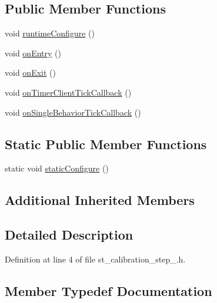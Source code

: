 \subsection*{Public Member Functions}
\begin{DoxyCompactItemize}
\item 
void \hyperlink{structsm__respira__1_1_1StCalibrationStep1_a041c623fb452bde3f3abd51eb5d9a7e6}{runtime\+Configure} ()
\item 
void \hyperlink{structsm__respira__1_1_1StCalibrationStep1_ab5935eecf1ce4037e27816db8df8e224}{on\+Entry} ()
\item 
void \hyperlink{structsm__respira__1_1_1StCalibrationStep1_a8b1c4ef9870ba819fa32794ff7a52ef2}{on\+Exit} ()
\item 
void \hyperlink{structsm__respira__1_1_1StCalibrationStep1_a0076674470e3964b263531f3f41c73e6}{on\+Timer\+Client\+Tick\+Callback} ()
\item 
void \hyperlink{structsm__respira__1_1_1StCalibrationStep1_a5753db04586e997320c8e3916c6c2642}{on\+Single\+Behavior\+Tick\+Callback} ()
\end{DoxyCompactItemize}
\subsection*{Static Public Member Functions}
\begin{DoxyCompactItemize}
\item 
static void \hyperlink{structsm__respira__1_1_1StCalibrationStep1_a2e817276acf8ab351121f8459e00b0f2}{static\+Configure} ()
\end{DoxyCompactItemize}
\subsection*{Additional Inherited Members}


\subsection{Detailed Description}


Definition at line 4 of file st\+\_\+calibration\+\_\+step\+\_.\+h.



\subsection{Member Typedef Documentation}
